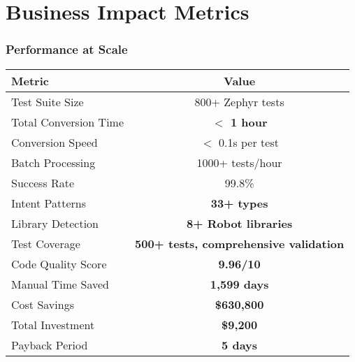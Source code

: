 \section{Business Impact Metrics}
\begin{frame}
\frametitle{Performance at Scale}
\begin{center}
\begin{tabular}{|l|c|}
\hline
\textbf{Metric} & \textbf{Value} \\
\hline
Test Suite Size & 800+ Zephyr tests \\
\hline
Total Conversion Time & \textbf{$<$ 1 hour} \\
\hline
Conversion Speed & $<$ 0.1s per test \\
\hline
Batch Processing & 1000+ tests/hour \\
\hline
Success Rate & 99.8\% \\
\hline
Intent Patterns & \textbf{33+ types} \\
\hline
Library Detection & \textbf{8+ Robot libraries} \\
\hline
Test Coverage & \textbf{500+ tests, comprehensive validation} \\
\hline
Code Quality Score & \textbf{9.96/10} \\
\hline
Manual Time Saved & \textbf{1,599 days} \\
\hline
Cost Savings & \textbf{\$630,800} \\
\hline
Total Investment & \textbf{\$9,200} \\
\hline
Payback Period & \textbf{5 days} \\
\hline
\end{tabular}

\end{center}
\end{frame}

